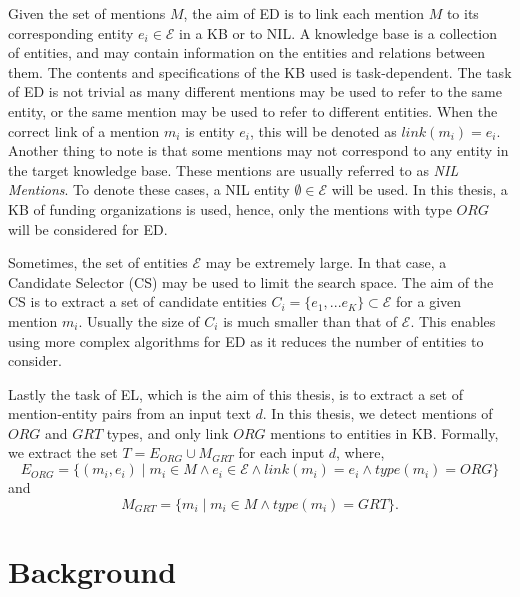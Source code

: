 \documentclass{report}
\theoremstyle{definition}
\theoremstyle{remark}
\begin{document}
Given the set of mentions $M$, the aim of ED is to link each mention $M$ to its corresponding entity $e_i \in \mathcal{E} $ in a KB or to NIL. A knowledge base is a collection of entities, and may contain information on the entities and relations between them. The contents and specifications of the KB used is task-dependent. The task of ED is not trivial as many different mentions may be used to refer to the same entity, or the same mention may be used to refer to different entities. When the correct link of a mention $m_i$ is entity $e_i$, this will be denoted as $link(m_i) = e_i $.  Another thing to note is that some mentions may not correspond to any entity in the target knowledge base. These mentions are usually referred to as \textit{NIL Mentions}. To denote these cases, a NIL entity $\emptyset \in \mathcal{E}$ will be used. In this thesis, a KB of funding organizations is used, hence, only the mentions with type $ORG$ will be considered for ED.

Sometimes, the set of entities $\mathcal{E}$ may be extremely large. In that case, a Candidate Selector (CS) may be used to limit the search space. The aim of the CS is to extract a set of candidate entities $C_i = \{e_1,...e_K\} \subset \mathcal{E} $ for a given mention $m_i$. Usually the size of $C_i$ is much smaller than that of $\mathcal{E}$. This enables using more complex algorithms for ED as it reduces the number of entities to consider.

Lastly the task of EL, which is the aim of this thesis, is to extract a set of mention-entity pairs from an input text $d$. In this thesis, we detect mentions of $ORG$ and $GRT$ types, and only link $ORG$ mentions to entities in KB. Formally, we extract the set $T = E_{ORG} \cup M_{GRT}$ for each input $d$, where,
\begin{equation}
E_{ORG}=\{(m_i,e_i) \mid m_i \in M \land e_i \in \mathcal{E} \land link(m_i)=e_i \land type(m_i) = ORG\}
\end{equation}
and 
\begin{equation}
M_{GRT} = \{m_i \mid m_i \in M \land type(m_i) = GRT\}.
\end{equation}

\section{Background}
\label{sec:BERT}
\end{document}
